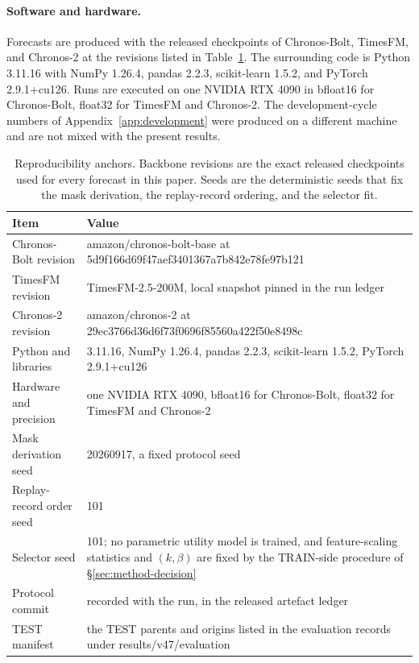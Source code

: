 \documentclass{article}
\begin{document}
\paragraph{Software and hardware.} Forecasts are produced with the released checkpoints of
Chronos-Bolt, TimesFM, and Chronos-2 at the revisions listed in Table~\ref{tab:app-repro}.
The surrounding code is Python 3.11.16 with NumPy 1.26.4, pandas
2.2.3, scikit-learn 1.5.2, and PyTorch 2.9.1+cu126. Runs are
executed on one NVIDIA RTX 4090 in bfloat16 for Chronos-Bolt, float32 for TimesFM and Chronos-2. The development-cycle numbers of
Appendix~\ref{app:development} were produced on a different machine and are not mixed with the
present results.

\begin{table}[htbp]
  \caption{Reproducibility anchors. Backbone revisions are the exact released checkpoints used
  for every forecast in this paper. Seeds are the deterministic seeds that fix the mask
  derivation, the replay-record ordering, and the selector fit.}
  \label{tab:app-repro}
  \centering
  \small
  \setlength{\tabcolsep}{4pt}
  \begin{tabular}{@{}l p{}@{}}
    \toprule
    Item & Value \\
    \midrule
    Chronos-Bolt revision   & amazon/chronos-bolt-base at 5d9f166d69f47aef3401367a7b842e78fe97b121 \\
    TimesFM revision        & TimesFM-2.5-200M, local snapshot pinned in the run ledger \\
    Chronos-2 revision      & amazon/chronos-2 at 29ec3766d36d6f73f0696f85560a422f50e8498c \\
    Python and libraries    & 3.11.16, NumPy 1.26.4, pandas 2.2.3, scikit-learn 1.5.2, PyTorch 2.9.1+cu126 \\
    Hardware and precision  & one NVIDIA RTX 4090, bfloat16 for Chronos-Bolt, float32 for TimesFM and Chronos-2 \\
    Mask derivation seed    & 20260917, a fixed protocol seed \\
    Replay-record order seed & 101 \\
    Selector seed             & 101; no parametric utility model is trained, and feature-scaling statistics and $(k,\beta)$ are fixed by the TRAIN-side procedure of \S\ref{sec:method-decision} \\
    Protocol commit         & recorded with the run, in the released artefact ledger \\
    TEST manifest           & the TEST parents and origins listed in the evaluation records under results/v47/evaluation \\
    \bottomrule
  \end{tabular}
\end{table}
\end{document}
